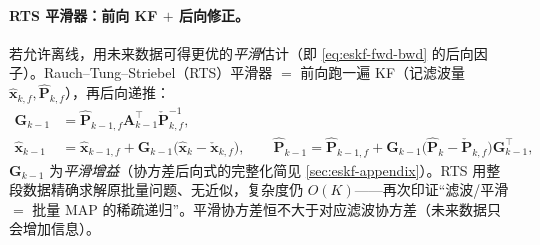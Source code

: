 \paragraph{RTS 平滑器：前向 KF $+$ 后向修正。}
若允许离线，用未来数据可得更优的\emph{平滑}估计（即 \cref{eq:eskf-fwd-bwd} 的后向因子）。Rauch–Tung–Striebel（RTS）平滑器 $=$ 前向跑一遍 KF（记滤波量 $\hat{\mathbf{x}}_{k,f},\hat{\mathbf{P}}_{k,f}$），再后向递推：
\begin{align}
  \mathbf{G}_{k-1}&=\hat{\mathbf{P}}_{k-1,f}\mathbf{A}_{k-1}^\top\check{\mathbf{P}}_{k,f}^{-1}, \label{eq:rts}\\
  \hat{\mathbf{x}}_{k-1}&=\hat{\mathbf{x}}_{k-1,f}+\mathbf{G}_{k-1}\big(\hat{\mathbf{x}}_k-\check{\mathbf{x}}_{k,f}\big),\qquad
  \hat{\mathbf{P}}_{k-1}=\hat{\mathbf{P}}_{k-1,f}+\mathbf{G}_{k-1}\big(\hat{\mathbf{P}}_k-\check{\mathbf{P}}_{k,f}\big)\mathbf{G}_{k-1}^\top, \label{eq:rts-cov}
\end{align}
$\mathbf{G}_{k-1}$ 为\emph{平滑增益}（协方差后向式的完整化简见 \cref{sec:eskf-appendix}）。RTS 用整段数据精确求解原批量问题、无近似，复杂度仍 $O(K)$——再次印证“滤波/平滑 $=$ 批量 MAP 的稀疏递归”\cite{barfoot2024state}。平滑协方差恒不大于对应滤波协方差（未来数据只会增加信息）。

